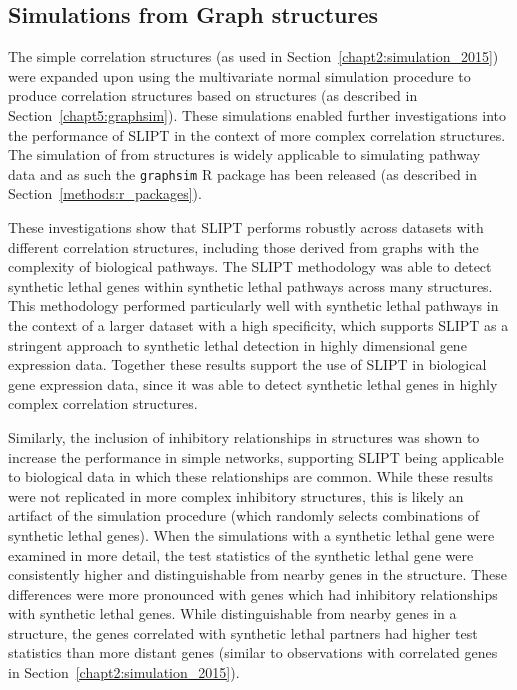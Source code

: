 
\subsection{Simulations from Graph structures}

The simple correlation structures (as used in Section~\ref{chapt2:simulation_2015}) were expanded upon %
using the multivariate normal simulation procedure to produce correlation structures based on  structures (as described in Section~\ref{chapt5:graphsim}). These simulations enabled further investigations into the performance of \gls{SLIPT} in the context of more complex correlation structures. The simulation of  from  structures is widely applicable to simulating pathway  data and as such the \texttt{graphsim} R package has been released (as described in Section~\ref{methods:r_packages}).

These investigations show that \gls{SLIPT} performs robustly across datasets with different correlation structures, including those derived from \glspl{graph} with the complexity of biological pathways. The \gls{SLIPT} methodology was able to detect \gls{synthetic lethal} genes within \gls{synthetic lethal} pathways across many  structures. This methodology performed particularly well with \gls{synthetic lethal} pathways in the context of a larger dataset with a high specificity, which supports \gls{SLIPT} as a stringent approach to \gls{synthetic lethal} detection in highly dimensional \gls{gene expression} data. Together these results support the use of \gls{SLIPT} in biological gene expression data, since it was able to detect \gls{synthetic lethal} genes in highly complex correlation structures.

Similarly, the inclusion of inhibitory relationships in  structures was shown to increase the performance in simple networks, supporting \gls{SLIPT} being applicable to biological data in which these relationships are common. While these results were not replicated in more complex inhibitory  structures, this is likely an artifact of the simulation procedure (which randomly selects combinations of \gls{synthetic lethal} genes). %
When the simulations with a \gls{synthetic lethal} gene were examined in more detail, the test statistics of the \gls{synthetic lethal} gene were consistently higher and distinguishable from nearby genes in the  structure. %
These differences were more pronounced with genes which had inhibitory relationships with \gls{synthetic lethal} genes. While distinguishable from nearby genes in a  structure, the genes correlated with \gls{synthetic lethal} partners had higher test statistics than more distant genes (similar to observations with correlated genes in Section~\ref{chapt2:simulation_2015}).


